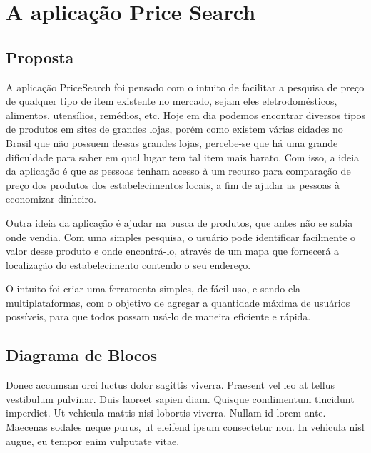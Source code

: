 \section{A aplicação Price Search}

\subsection{Proposta}
A aplicação PriceSearch foi pensado com o intuito de facilitar a pesquisa de preço de qualquer tipo de item existente no mercado, sejam eles eletrodomésticos, alimentos, utensílios, remédios, etc. Hoje em dia podemos encontrar diversos tipos de produtos em sites de grandes lojas, porém como existem várias cidades no Brasil que não possuem dessas grandes lojas, percebe-se que há uma grande dificuldade para saber em qual lugar tem tal item mais barato. Com isso, a ideia da aplicação é que as pessoas tenham acesso à um recurso para comparação de preço dos produtos dos estabelecimentos locais, a fim de ajudar as pessoas à economizar dinheiro. 

Outra ideia da aplicação é ajudar na busca de produtos, que antes não se sabia onde vendia. Com uma simples pesquisa, o usuário pode identificar facilmente o valor desse produto e onde encontrá-lo, através de um mapa que fornecerá a localização do estabelecimento contendo o seu endereço.

O intuito foi criar uma ferramenta simples, de fácil uso, e sendo ela multiplataformas, com o objetivo de agregar a quantidade máxima de usuários possíveis, para que todos possam usá-lo de maneira eficiente e rápida.

\subsection{Diagrama de Blocos}

 Donec accumsan orci luctus dolor sagittis viverra. Praesent vel leo at tellus vestibulum pulvinar. Duis laoreet sapien diam. Quisque condimentum tincidunt imperdiet. Ut vehicula mattis nisi lobortis viverra. Nullam id lorem ante. Maecenas sodales neque purus, ut eleifend ipsum consectetur non. In vehicula nisl augue, eu tempor enim vulputate vitae.
 
